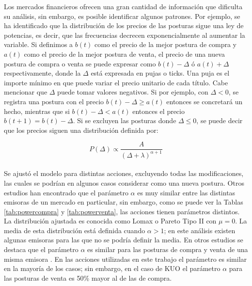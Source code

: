 \documentclass[11pt]{article}
\numberwithin{equation}{section} %
\begin{document}
Los mercados financieros ofrecen una gran cantidad de información que dificulta su análisis, sin embargo, es posible identificar algunos patrones. Por ejemplo, se ha identificado que la distribución de los precios de las posturas sigue una ley de potencias, es decir, que las frecuencias decrecen exponencialmente al aumentar la variable. Si definimos a $b(t)$ como el precio de la mejor postura de compra y $a(t)$ como el precio de la mejor postura de venta, el precio de una nueva postura de compra o venta se puede expresar como $b(t)-\Delta$ ó $a(t)+\Delta$ respectivamente, donde la $\Delta$ está expresada en pujas o ticks. Una puja es el importe mínimo en que puede variar el precio unitario de cada título. Cabe mencionar que $\Delta$ puede tomar valores negativos. Si por ejemplo, con $\Delta <0$, se registra una postura con el precio $b(t)-\Delta \geq a(t)$ entonces se concretará un hecho, mientras que si $b(t)-\Delta < a(t)$ entonces el precio $b(t+1)=b(t)-\Delta$. Si se excluyen las posturas donde $\Delta \leq 0$, se puede decir que los precios siguen una distribución definida por:

\begin{equation}
P\left(\Delta\right) \propto \frac{A}{{\left(\Delta+\lambda\right)}^{\alpha+1}}
\end{equation}
\\

Se ajustó el modelo para distintas acciones, excluyendo todas las modificaciones, las cuales se podrían en algunos casos considerar como una nueva postura. Otros estudios han encontrado que el parámetro $\alpha$ es muy similar entre las distintas emisoras \cite{zovko2002power} de un mercado en particular, sin embargo, como se puede ver la Tablas \ref{tab:powercompra} y \ref{tab:powerventa}, las acciones tienen parámetros distintos. La distribución ajustada es conocida como Lomax o Pareto Tipo II con $\mu=0$. La media de esta distribución está definida cuando $\alpha>1$; en este análisis existen algunas emisoras para las que no se podría definir la media. En otros estudios se destaca que el parámetro $\alpha$ es similar para las posturas de compra y venta de una misma emisora \cite{Bouchaud2002}. En las acciones utilizadas en este trabajo el parámetro es similar en la mayoría de los casos; sin embargo, en el caso de KUO el parámetro $\alpha$ para las posturas de venta es 50\% mayor al de las de compra.\\
\end{document}

